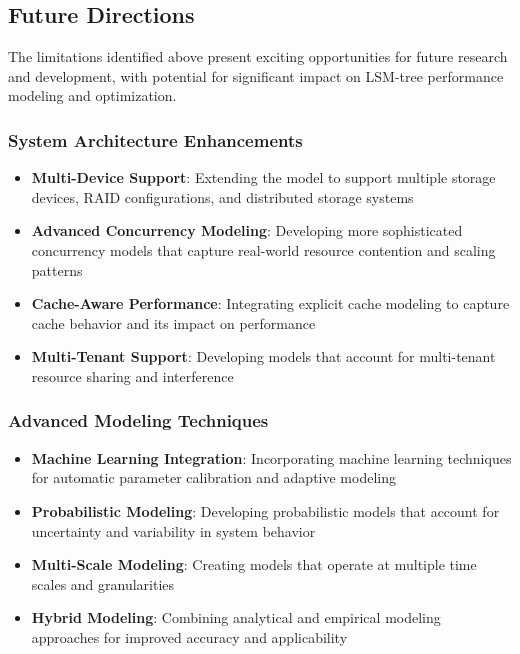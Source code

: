 \documentclass[11pt]{article}
\begin{document}
\subsection{Future Directions}

The limitations identified above present exciting opportunities for future research and development, with potential for significant impact on LSM-tree performance modeling and optimization.

\subsubsection{System Architecture Enhancements}
\begin{itemize}
    \item \textbf{Multi-Device Support}: Extending the model to support multiple storage devices, RAID configurations, and distributed storage systems
    \item \textbf{Advanced Concurrency Modeling}: Developing more sophisticated concurrency models that capture real-world resource contention and scaling patterns
    \item \textbf{Cache-Aware Performance}: Integrating explicit cache modeling to capture cache behavior and its impact on performance
    \item \textbf{Multi-Tenant Support}: Developing models that account for multi-tenant resource sharing and interference
\end{itemize}

\subsubsection{Advanced Modeling Techniques}
\begin{itemize}
    \item \textbf{Machine Learning Integration}: Incorporating machine learning techniques for automatic parameter calibration and adaptive modeling
    \item \textbf{Probabilistic Modeling}: Developing probabilistic models that account for uncertainty and variability in system behavior
    \item \textbf{Multi-Scale Modeling}: Creating models that operate at multiple time scales and granularities
    \item \textbf{Hybrid Modeling}: Combining analytical and empirical modeling approaches for improved accuracy and applicability
\end{itemize}
\end{document}
